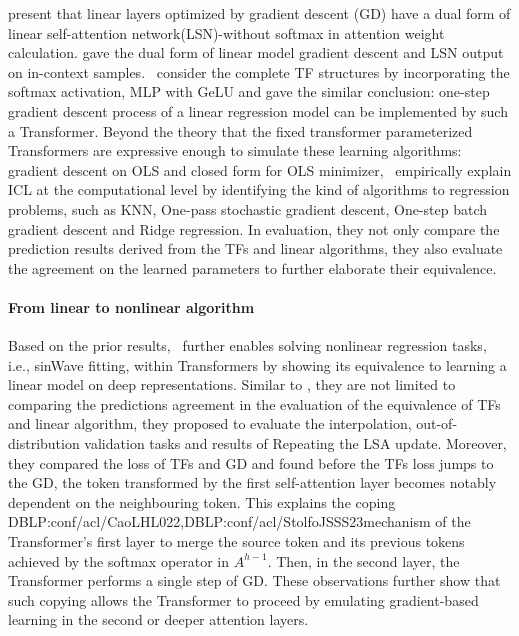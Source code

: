 \citet{irie2022dual} present that linear
layers optimized by gradient descent (GD) have a dual
form of linear self-attention network(LSN)-without softmax in attention weight calculation. \citet{dai2023can} gave the dual form of linear model gradient descent and LSN output on in-context samples.~\citet{DBLP:conf/iclr/AkyurekSA0Z23} consider the complete TF structures by incorporating the softmax activation, MLP with GeLU and gave the similar conclusion: one-step gradient descent process of a linear regression model can be implemented by such a Transformer. Beyond the theory that the fixed transformer parameterized Transformers are expressive enough to simulate these learning algorithms: gradient descent on OLS and closed form for OLS minimizer,~\citet{DBLP:conf/iclr/AkyurekSA0Z23} empirically explain ICL at the computational level by identifying the kind of algorithms to regression problems, such as KNN, One-pass stochastic gradient descent, One-step batch gradient descent and Ridge regression. In evaluation, they not only compare the prediction results derived from the TFs and linear algorithms, they also evaluate the agreement on the learned parameters to further elaborate their equivalence.


\paragraph{From linear to nonlinear algorithm}
Based on the prior results,~\citet{von2023transformers} further enables solving nonlinear regression tasks, i.e., sinWave fitting, within Transformers by showing its equivalence to learning a linear model on deep representations. Similar to \citet{DBLP:conf/iclr/AkyurekSA0Z23}, they are not limited to comparing the predictions agreement in the evaluation of the equivalence of TFs and linear algorithm, they proposed to evaluate the interpolation, out-of-distribution validation tasks and results of Repeating the LSA update. Moreover, they compared the loss of TFs and GD and found before the TFs loss jumps to the GD, the token transformed by the first self-attention layer becomes notably dependent on the neighbouring token. This explains the coping DBLP:conf/acl/CaoLHL022,DBLP:conf/acl/StolfoJSSS23mechanism of the Transformer’s first layer to merge the source token and its previous tokens achieved by the softmax operator in $A^{h-1}$. Then, in the second layer, the Transformer performs a single step of GD. These observations further show that such copying allows the Transformer to proceed by emulating gradient-based learning in the second or deeper attention layers. 

